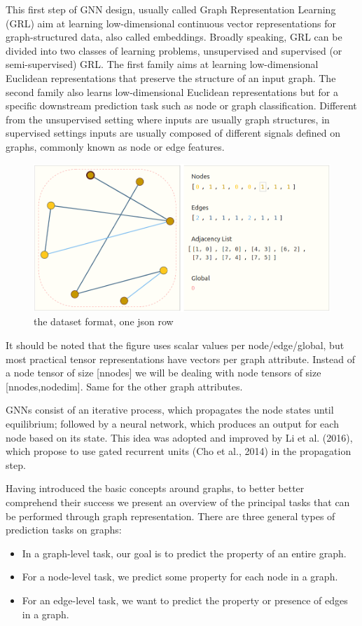 \documentclass[binding=0.6cm]{sapthesis}
\begin{document}
This first step of GNN design, usually called Graph Representation Learning (GRL) aim at learning low-dimensional continuous vector representations for graph-structured data, also called embeddings. Broadly speaking, GRL can be divided into two classes of learning problems, unsupervised and supervised (or semi-supervised) GRL. The first family aims at learning low-dimensional Euclidean representations that preserve the structure of an input graph. The second family also learns low-dimensional Euclidean representations but for a specific downstream prediction task such as node or graph classification. Different from the unsupervised setting where inputs are usually graph structures, in supervised settings inputs are usually composed of different signals defined on graphs, commonly known as node or edge features.

\begin{figure}
    \label{fig:bg.graph_repr}
    \centering
    \includegraphics[width=\textwidth]{imgs/background/graph-repr.png}   
    \caption{the dataset format, one json row}
\end{figure}

It should be noted that the figure uses scalar values per node/edge/global, but most practical tensor representations have vectors per graph attribute. Instead of a node tensor of size [nnodes] we will be dealing with node tensors of size [nnodes,nodedim]. Same for the other graph attributes.


GNNs consist of an iterative process, which propagates the node states until equilibrium; followed by a neural network, which produces an output for each node based on its state. This idea was adopted and improved by Li et al. (2016), which propose to use gated recurrent units (Cho et al., 2014) in the propagation step.

Having introduced the basic concepts around graphs, to better better comprehend their success we present an overview of the principal tasks that can be performed through graph representation. There are three general types of prediction tasks on graphs:
\begin{itemize}
    \item In a graph-level task, our goal is to predict the property of an entire graph.
    \item For a node-level task, we predict some property for each node in a graph. 
    \item For an edge-level task, we want to predict the property or presence of edges in a graph.
\end{itemize}
\end{document}
